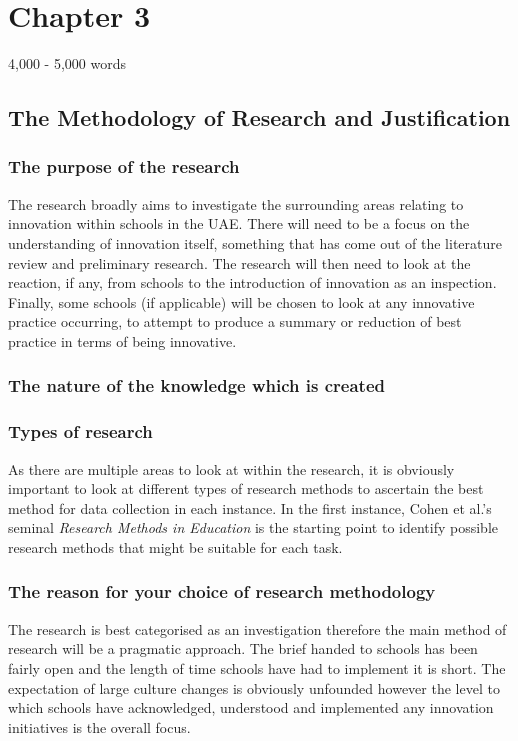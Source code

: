 \section{Chapter 3}
4,000 - 5,000 words
\subsection{The Methodology of Research and Justification}

\subsubsection{The purpose of the research}
The research broadly aims to investigate the surrounding areas relating to innovation within schools in the UAE. There will need to be a focus on the understanding of innovation itself, something that has come out of the literature review and preliminary research. The research will then need to look at the reaction, if any, from schools to the introduction of innovation as an inspection. Finally, some schools (if applicable) will be chosen to look at any innovative practice occurring, to attempt to produce a summary or reduction of best practice in terms of being innovative.

\subsubsection{The nature of the knowledge which is created}

\subsubsection{Types of research}

As there are multiple areas to look at within the research, it is obviously important to look at different types of research methods to ascertain the best method for data collection in each instance. In the first instance, Cohen et al.'s seminal \textit{Research Methods in Education} \citet{Cohen2005} is the starting point to identify possible research methods that might be suitable for each task.



\subsubsection{The reason for your choice of research methodology}
The research is best categorised as an investigation therefore the main method of research will be a pragmatic approach. The brief handed to schools has been fairly open and the length of time schools have had to implement it is short. The expectation of large culture changes is obviously unfounded however the level to which schools have acknowledged, understood and implemented any innovation initiatives is the overall focus. 

